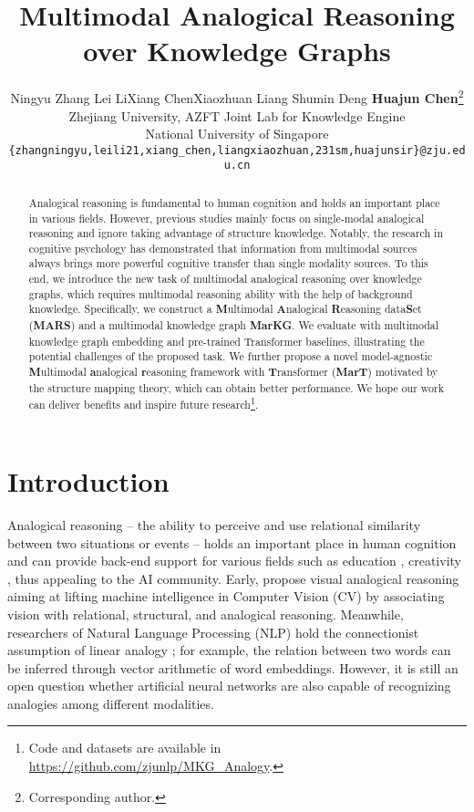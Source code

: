 \documentclass{article} \usepackage{iclr2023_conference,times}
\title{Multimodal Analogical Reasoning over Knowledge Graphs}
\author{Ningyu Zhang \quad Lei Li\quad Xiang Chen\quad Xiaozhuan Liang \quad Shumin Deng \quad \textbf{Huajun Chen}\thanks{Corresponding author.}\\
  Zhejiang University, AZFT Joint Lab for Knowledge Engine\\
National University of Singapore \\
  \texttt{\{zhangningyu,leili21,xiang\_chen,liangxiaozhuan,231sm,huajunsir\}@zju.edu.cn}\\ 
}
\newcommand{\ours}{MarT}
\begin{document}
\maketitle
\begin{abstract}
Analogical reasoning is fundamental to human cognition and holds an important place in various fields. However, previous studies mainly focus on single-modal analogical reasoning and ignore taking advantage of structure knowledge. Notably, the research in cognitive psychology has demonstrated that information from multimodal sources always brings more powerful cognitive transfer than single modality sources. To this end, we introduce the new task of multimodal analogical reasoning over knowledge graphs, which requires multimodal reasoning ability with the help of background knowledge. Specifically, we construct a \textbf{M}ultimodal \textbf{A}nalogical \textbf{R}easoning data\textbf{S}et (\textbf{MARS}) and a multimodal knowledge graph \textbf{MarKG}. We evaluate with multimodal knowledge graph embedding and pre-trained Transformer baselines, illustrating the potential challenges of the proposed task. We further propose a novel model-agnostic \textbf{M}ultimodal \textbf{a}nalogical \textbf{r}easoning framework with \textbf{T}ransformer (\textbf{\ours}) motivated by the structure mapping theory, which can obtain better performance. We hope our work can deliver benefits and inspire future research\footnote{Code and datasets are available in \url{https://github.com/zjunlp/MKG_Analogy}.}. 
\end{abstract}

\section{Introduction}


Analogical reasoning – the ability to perceive and use relational similarity between two situations or events – holds an important place in human cognition \citep{DBLP:journals/jetai/Johnson-Laird06,DBLP:journals/corr/abs-2007-11668,DBLP:journals/cacm/BengioLH21,E-KAR} and can provide back-end support for various fields such as education \citep{thagard1992analogy}, creativity \citep{goel1997design}, thus appealing to the AI community.
Early, \cite{mikolov-etal-2013-linguistic,BATs,DBLP:conf/acl/EthayarajhDH19a} propose visual analogical reasoning aiming at lifting machine intelligence in Computer Vision (CV) by associating vision with relational, structural, and analogical reasoning.
Meanwhile, researchers of Natural Language Processing (NLP) hold the connectionist assumption \citep{smp}  of linear analogy \citep{ethayarajh-etal-2019-towards}; for example, the relation between two words can be inferred through vector arithmetic of word embeddings.
However, it is still an open question whether artificial neural networks are also capable of recognizing analogies among different modalities.
\end{document}

